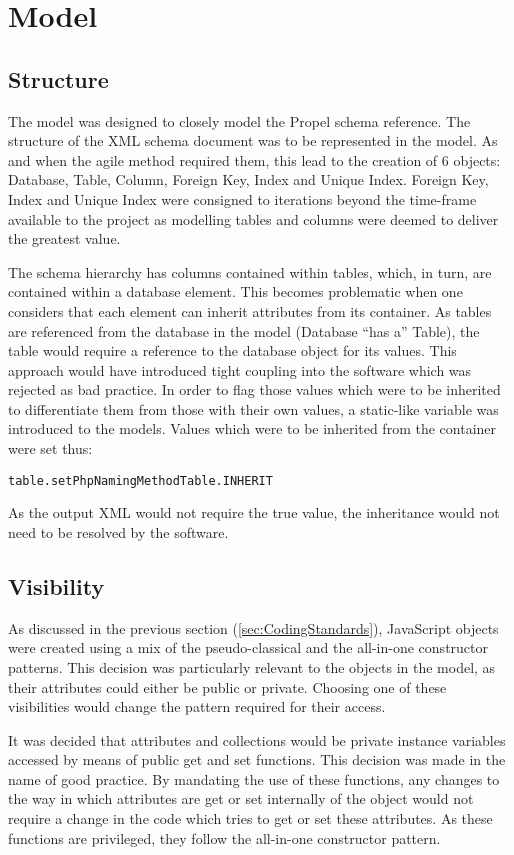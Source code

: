 \section{Model}\label{sec:DesignModel}
\subsection{Structure}
The model was designed to closely model the Propel schema reference. The structure of the XML schema document was to be represented in the model. As and when the agile method required them, this lead to the creation of 6 objects: Database, Table, Column, Foreign Key, Index and Unique Index. Foreign Key, Index and Unique Index were consigned to iterations beyond the time-frame available to the project as modelling tables and columns were deemed to deliver the greatest value.

The schema hierarchy has columns contained within tables, which, in turn, are contained within a database element. This becomes problematic when one considers that each element can inherit attributes from its container. As tables are referenced from the database in the model (Database ``has a'' Table), the table would require a reference to the database object for its values. This approach would have introduced tight coupling into the software which was rejected as bad practice. In order to flag those values which were to be inherited to differentiate them from those with their own values, a static-like variable was introduced to the models. Values which were to be inherited from the container were set thus:
\begin{alltt}table.setPhpNamingMethod Table.INHERIT\end{alltt}
As the output XML would not require the true value, the inheritance would not need to be resolved by the software.

\subsection{Visibility}
As discussed in the previous section (\ref{sec:CodingStandards}), Java\-Script objects were created using a mix of the pseudo-classical and the all-in-one constructor patterns. This decision was particularly relevant to the objects in the model, as their attributes could either be public or private. Choosing one of these visibilities would change the pattern required for their access.

It was decided that attributes and collections would be private instance variables accessed by means of public get and set functions. This decision was made in the name of good practice. By mandating the use of these functions, any changes to the way in which attributes are get or set internally of the object would not require a change in the code which tries to get or set these attributes. As these functions are privileged, they follow the all-in-one constructor pattern.

